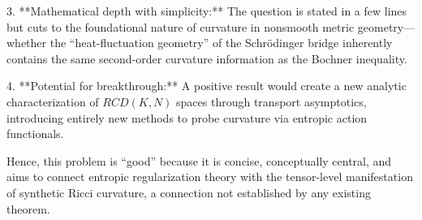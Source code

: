 3. **Mathematical depth with simplicity:**  
   The question is stated in a few lines but cuts to the foundational nature of curvature in nonsmooth metric geometry—whether the “heat-fluctuation geometry” of the Schrödinger bridge inherently contains the same second-order curvature information as the Bochner inequality.  
   
4. **Potential for breakthrough:**  
   A positive result would create a new analytic characterization of \(RCD(K,N)\) spaces through transport asymptotics, introducing entirely new methods to probe curvature via entropic action functionals.  
   
Hence, this problem is “good” because it is concise, conceptually central, and aims to connect entropic regularization theory with the tensor-level manifestation of synthetic Ricci curvature, a connection not established by any existing theorem.